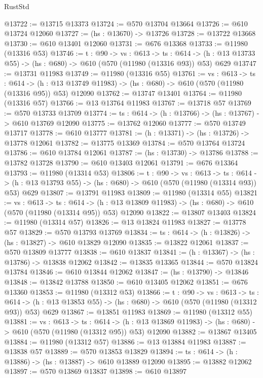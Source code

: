 \begin{lexlean}{RustStd}
\begin{coremodule}
@13722 := @13715 @13373
@13724 := @570 @13704 @13664
@13726 := @610 @13724 @12060
@13727 := (hs : @13670) -> @13726
@13728 := @13722 @13668
@13730 := @610 @13401 @12060
@13731 := @676 @13368
@13733 := @11980 (@13316 @53)
@13746 := {t : @90} ->
  {vs : @613} ->
  {ts : @614} -> (h : @13 @13733 @55) -> (hs : @680) -> @610 (@570 (@11980 (@13316 @93)) @53) @629
@13747 := @13731 @11983
@13749 := @11980 (@13316 @55)
@13761 := {vs : @613} ->
  {ts : @614} ->
  (h : @13 @13749 @11983) -> (hs : @680) -> @610 (@570 (@11980 (@13316 @95)) @53) @12090
@13762 := @13747 @13401
@13764 := @11980 (@13316 @57)
@13766 := @13 @13764 @11983
@13767 := @13718 @57
@13769 := @570 @13733 @13709
@13774 := {ts : @614} -> (h : @13766) -> (hs : @13767) -> @610 @13769 @12090
@13775 := @13762 @12060
@13777 := @570 @13749 @13717
@13778 := @610 @13777
@13781 := (h : @13371) -> (hs : @13726) -> @13778 @12061
@13782 := @13775 @13369
@13784 := @570 @13764 @13724
@13786 := @610 @13784 @12061
@13787 := (hs : @13730) -> @13786
@13788 := @13782 @13728
@13790 := @610 @13403 @12061
@13791 := @676 @13364
@13793 := @11980 (@13314 @53)
@13806 := {t : @90} ->
  {vs : @613} ->
  {ts : @614} -> (h : @13 @13793 @55) -> (hs : @680) -> @610 (@570 (@11980 (@13314 @93)) @53) @629
@13807 := @13791 @11983
@13809 := @11980 (@13314 @55)
@13821 := {vs : @613} ->
  {ts : @614} ->
  (h : @13 @13809 @11983) -> (hs : @680) -> @610 (@570 (@11980 (@13314 @95)) @53) @12090
@13822 := @13807 @13403
@13824 := @11980 (@13314 @57)
@13826 := @13 @13824 @11983
@13827 := @13778 @57
@13829 := @570 @13793 @13769
@13834 := {ts : @614} -> (h : @13826) -> (hs : @13827) -> @610 @13829 @12090
@13835 := @13822 @12061
@13837 := @570 @13809 @13777
@13838 := @610 @13837
@13841 := (h : @13367) -> (hs : @13786) -> @13838 @12062
@13842 := @13835 @13365
@13844 := @570 @13824 @13784
@13846 := @610 @13844 @12062
@13847 := (hs : @13790) -> @13846
@13848 := @13842 @13788
@13850 := @610 @13405 @12062
@13851 := @676 @13360
@13853 := @11980 (@13312 @53)
@13866 := {t : @90} ->
  {vs : @613} ->
  {ts : @614} -> (h : @13 @13853 @55) -> (hs : @680) -> @610 (@570 (@11980 (@13312 @93)) @53) @629
@13867 := @13851 @11983
@13869 := @11980 (@13312 @55)
@13881 := {vs : @613} ->
  {ts : @614} ->
  (h : @13 @13869 @11983) -> (hs : @680) -> @610 (@570 (@11980 (@13312 @95)) @53) @12090
@13882 := @13867 @13405
@13884 := @11980 (@13312 @57)
@13886 := @13 @13884 @11983
@13887 := @13838 @57
@13889 := @570 @13853 @13829
@13894 := {ts : @614} -> (h : @13886) -> (hs : @13887) -> @610 @13889 @12090
@13895 := @13882 @12062
@13897 := @570 @13869 @13837
@13898 := @610 @13897

\end{coremodule}
\end{lexlean}

